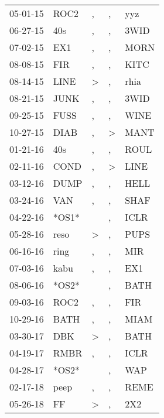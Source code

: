 \begin{supertabular}{lllll}
 05-01-15 &   ROC2 &                , &             , &    yyz \\
 06-27-15 &    40s &                , &             , &   3WID \\
 07-02-15 &    EX1 &                , &             , &   MORN \\
 08-08-15 &    FIR &                , &             , &   KITC \\
 08-14-15 &   LINE &     \textgreater &             , &   rhia \\
 08-21-15 &   JUNK &                , &             , &   3WID \\
 09-25-15 &   FUSS &                , &             , &   WINE \\
 10-27-15 &   DIAB &                , &  \textgreater &   MANT \\
 01-21-16 &    40s &                , &             , &   ROUL \\
 02-11-16 &   COND &                , &  \textgreater &   LINE \\
 03-12-16 &   DUMP &                , &             , &   HELL \\
 03-24-16 &    VAN &                , &             , &   SHAF \\
 04-22-16 &  *OS1* &                  &             , &   ICLR \\
 05-28-16 &   reso &     \textgreater &             , &   PUPS \\
 06-16-16 &   ring &                , &             , &    MIR \\
 07-03-16 &   kabu &                , &             , &    EX1 \\
 08-06-16 &  *OS2* &                  &             , &   BATH \\
 09-03-16 &   ROC2 &                , &             , &    FIR \\
 10-29-16 &   BATH &                , &             , &   MIAM \\
 03-30-17 &    DBK &     \textgreater &             , &   BATH \\
 04-19-17 &   RMBR &                , &             , &   ICLR \\
 04-28-17 &  *OS2* &                  &             , &    WAP \\
 02-17-18 &   peep &                , &             , &   REME \\
 05-26-18 &     FF &     \textgreater &             , &    2X2 \\

\end{supertabular}
